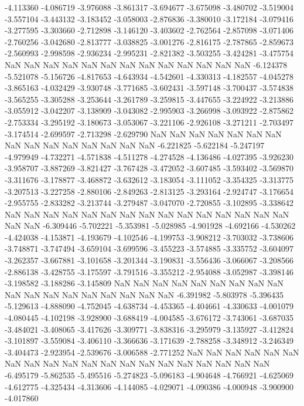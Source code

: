 -4.113360
-4.086719
-3.976088
-3.861317
-3.694677
-3.675098
-3.480702
-3.519004
-3.557104
-3.443132
-3.183452
-3.058003
-2.876836
-3.380010
-3.172184
-3.079416
-3.277595
-3.303660
-2.712898
-3.146120
-3.403602
-2.762564
-2.857098
-3.071406
-2.760256
-3.042680
-2.813777
-3.038825
-3.001276
-2.816175
-2.787865
-2.859673
-2.560993
-2.998598
-2.936234
-2.995231
-2.821382
-3.503255
-3.424281
-3.475754
NaN
NaN
NaN
NaN
NaN
NaN
NaN
NaN
NaN
NaN
NaN
NaN
NaN
-6.124378
-5.521078
-5.156726
-4.817653
-4.643934
-4.542601
-4.330313
-4.182557
-4.045278
-3.865163
-4.032429
-3.930748
-3.771685
-3.602431
-3.597148
-3.700437
-3.574838
-3.565255
-3.305288
-3.253644
-3.261789
-3.259815
-3.447655
-3.224922
-3.213886
-3.055912
-3.042207
-3.138909
-3.043082
-2.995903
-3.266998
-3.093922
-2.875862
-2.753334
-3.295192
-3.180673
-3.053067
-3.221106
-2.926108
-3.271211
-2.703497
-3.174514
-2.699597
-2.713298
-2.629790
NaN
NaN
NaN
NaN
NaN
NaN
NaN
NaN
NaN
NaN
NaN
NaN
NaN
NaN
NaN
-6.221825
-5.622184
-5.247197
-4.979949
-4.732271
-4.571838
-4.511278
-4.274528
-4.136486
-4.027395
-3.926230
-3.958707
-3.887269
-3.821427
-3.767428
-3.472052
-3.607485
-3.593402
-3.569870
-3.311676
-3.178877
-3.468872
-3.632612
-3.183054
-3.111052
-3.354325
-3.313775
-3.207513
-3.227258
-2.880106
-2.849263
-2.813125
-3.293164
-2.924747
-3.176654
-2.955755
-2.833282
-3.213744
-3.279487
-3.047070
-2.720855
-3.102895
-3.338642
NaN
NaN
NaN
NaN
NaN
NaN
NaN
NaN
NaN
NaN
NaN
NaN
NaN
NaN
NaN
NaN
NaN
-6.309446
-5.702221
-5.353981
-5.028985
-4.901928
-4.692166
-4.530262
-4.424038
-4.153871
-4.193679
-4.102546
-4.199753
-3.908212
-3.703032
-3.738606
-3.748871
-3.747494
-3.659104
-3.699596
-3.455223
-3.574885
-3.335752
-3.604097
-3.262357
-3.667881
-3.101658
-3.201344
-3.190831
-3.556436
-3.066067
-3.208566
-2.886138
-3.428755
-3.175597
-3.791516
-3.355212
-2.954088
-3.052987
-3.398146
-3.198582
-3.188286
-3.145809
NaN
NaN
NaN
NaN
NaN
NaN
NaN
NaN
NaN
NaN
NaN
NaN
NaN
NaN
NaN
NaN
NaN
NaN
-6.391982
-5.803978
-5.396435
-5.129613
-4.888090
-4.752045
-4.638734
-4.453365
-4.404661
-4.330633
-4.001079
-4.080445
-4.102198
-3.928900
-3.688419
-4.004585
-3.676172
-3.743061
-3.687035
-3.484021
-3.408065
-3.417626
-3.309771
-3.838316
-3.295979
-3.135927
-3.412824
-3.101897
-3.559084
-3.406110
-3.366636
-3.171639
-2.788258
-3.348912
-3.246349
-3.404473
-2.923954
-2.539676
-3.006588
-2.771252
NaN
NaN
NaN
NaN
NaN
NaN
NaN
NaN
NaN
NaN
NaN
NaN
NaN
NaN
NaN
NaN
NaN
NaN
NaN
NaN
-6.495179
-5.862535
-5.495516
-5.274823
-5.096183
-4.904648
-4.766921
-4.625069
-4.612775
-4.325434
-4.313606
-4.144085
-4.029071
-4.090386
-4.000948
-3.900900
-4.017860

